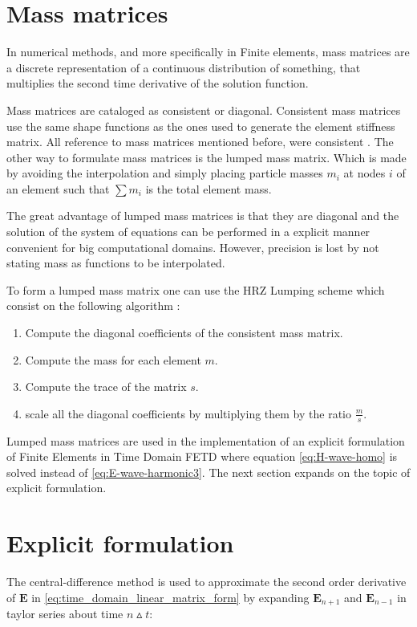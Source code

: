 \section{Mass matrices}
\label{sec:explicit_formulation}
In numerical methods, and more specifically in Finite elements, mass matrices are a discrete representation of a continuous distribution of something, that multiplies the second time derivative of the solution function.

Mass matrices are cataloged as consistent or diagonal. Consistent mass matrices use the same shape functions as the ones used to generate the element stiffness matrix. All reference to mass matrices mentioned before, were consistent \cite{RobertD.Cook1989}. 
The other way to formulate mass matrices is the lumped mass matrix. Which is made by avoiding the interpolation and simply placing particle masses $m_i$ at nodes $i$ of an element such that $\sum m_i$ is the total element mass. 

The great advantage of lumped mass matrices is that they are diagonal and the solution of the system of equations can be performed in a explicit manner convenient for big computational domains.
However, precision is lost by not stating mass as functions to be interpolated. 

To form a lumped mass matrix one can use the HRZ Lumping scheme 
which consist on the following algorithm \cite{RobertD.Cook1989}:

\begin{enumerate}
\item Compute the diagonal coefficients of the consistent mass matrix.
\item Compute the mass for each element $m$.
\item Compute the trace of the matrix $s$.
\item scale all the diagonal coefficients by multiplying them by the ratio $\frac{m}{s}$.
\end{enumerate}
Lumped mass matrices are used in the implementation of an explicit formulation of Finite Elements in Time Domain FETD where equation \ref{eq:H-wave-homo} is solved instead of \ref{eq:E-wave-harmonic3}. The next section expands on the topic of explicit formulation.

\section{Explicit formulation}

The central-difference method is used to approximate the second order derivative of $\mathbf{E}$ in \ref{eq:time_domain_linear_matrix_form} by expanding $\mathbf{E}_{n+1}$ and $\mathbf{E}_{n-1}$  in taylor series about time $n \vartriangle t$:

